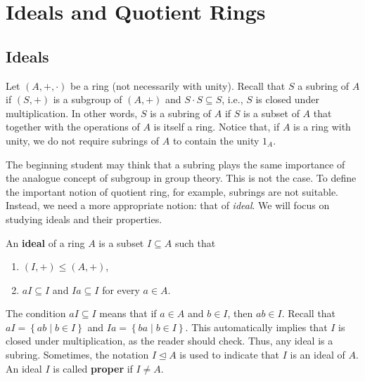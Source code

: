 \documentclass[11pt,a4paper]{article}
\begin{document}
\def\contador{Lesson 10}


\section{Ideals and Quotient Rings}
\subsection{Ideals}

Let \((A,+,\cdot)\) be a ring (not necessarily with unity).
Recall that \(S\) a subring of \(A\)  if   \((S,+)\) is a subgroup of \((A,+)\) and \(S\cdot S \subseteq S\), i.e., \(S\) is closed under multiplication. 
In other words, \(S\) is  a   subring of \(A\) if \(S\) is a subset of \(A\) that  together with the operations of \(A\) is itself a ring.
Notice that, if \(A\) is a ring with unity,  we do not require subrings of \(A\) to  contain the unity \(1_A\).

The beginning student may think that a subring plays the same importance of the analogue concept of subgroup in group theory.
This is not the case.
To define the important notion of quotient ring, for example, subrings are not suitable.
Instead, we need a more appropriate notion: that of \textit{ideal}.
We will focus on studying ideals and their properties.

\begin{defi}
    An \textbf{ideal} of a ring \(A\) is a subset \(I\subseteq A\) such that 
    \begin{enumerate}[label=(\roman*)]
        \item \((I,+)\leq (A,+)\),  
        \item \(a I \subseteq I\) and \(Ia \subseteq I\) for every \(a\in A\).
    \end{enumerate}
\end{defi}

The condition \(aI\subseteq I\)  means that if \(a\in A\) and \(b \in I\), then \(ab \in I\). Recall that \(aI = \left\{ a b \mid b\in I \right\}\)
and  \(I a = \left\{  ba  \mid b\in I \right\}\).
This automatically implies that \(I\) is closed under multiplication, as the reader should check.
Thus, any   ideal is a subring. 
Sometimes, the notation \(I\trianglelefteq A\) is used to indicate that \(I\) is an ideal of \(A\).
An ideal \(I\) is called \textbf{proper} if  \(I\neq A\).
\end{document}
